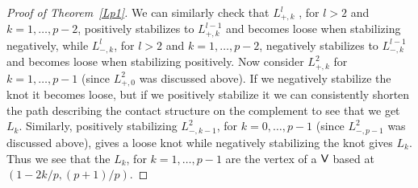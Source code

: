 \documentclass[11pt]{amsart}
\theoremstyle{plain}
\theoremstyle{definition}
\theoremstyle{remark}
\numberwithin{theorem}{section}
\begin{document}
\begin{proof}[Proof of Theorem~\ref{Lp1}]
We can similarly check that $L^l_{+, k}$ , for $l>2$ and $k=1,\ldots, p-2$, positively stabilizes to $L^{l-1}_{+,k}$ and becomes loose when stabilizing negatively, while $L^l_{-, k}$, for $l>2$ and $k=1,\ldots, p-2$, negatively stabilizes to $L^{l-1}_{-,k}$ and becomes loose when stabilizing positively. Now consider $L^2_{+,k}$ for $k=1, \ldots, p-1$ (since $L^2_{+,0}$ was discussed above). If we negatively stabilize the knot it becomes loose, but if we positively stabilize it we can consistently shorten the path describing the contact structure on the complement to see that we get $L_{k}$. Similarly, positively stabilizing $L^2_{-,k-1}$, for $k=0, \ldots, p-1$ (since $L^2_{-,p-1}$ was discussed above), gives a loose knot while negatively stabilizing the knot gives $L_{k}$. Thus we see that the $L_k$, for $k=1, \ldots, p-1$ are the vertex of a $\normalfont\textsf{V}$ based at $(1-2k/p, (p+1)/p)$. 
\end{proof}
\end{document}
